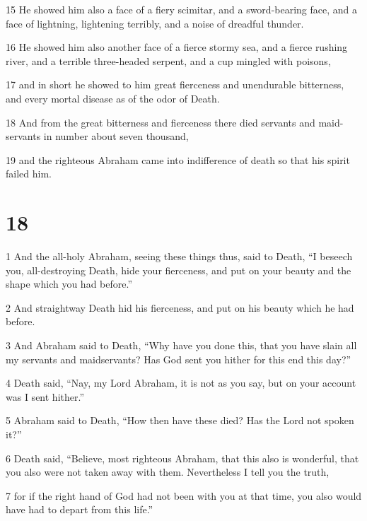 \par 15 He showed him also a face of a fiery scimitar, and a sword-bearing face, and a face of lightning, lightening terribly, and a noise of dreadful thunder. 

\par 16 He showed him also another face of a fierce stormy sea, and a fierce rushing river, and a terrible three-headed serpent, and a cup mingled with poisons, 

\par 17 and in short he showed to him great fierceness and unendurable bitterness, and every mortal disease as of the odor of Death. 

\par 18 And from the great bitterness and fierceness there died servants and maid-servants in number about seven thousand, 

\par 19 and the righteous Abraham came into indifference of death so that his spirit failed him.

\chapter{18}

\par 1 And the all-holy Abraham, seeing these things thus, said to Death, “I beseech you, all-destroying Death, hide your fierceness, and put on your beauty and the shape which you had before.” 

\par 2 And straightway Death hid his fierceness, and put on his beauty which he had before. 

\par 3 And Abraham said to Death, “Why have you done this, that you have slain all my servants and maidservants? Has God sent you hither for this end this day?” 

\par 4 Death said, “Nay, my Lord Abraham, it is not as you say, but on your account was I sent hither.” 

\par 5 Abraham said to Death, “How then have these died? Has the Lord not spoken it?” 

\par 6 Death said, “Believe, most righteous Abraham, that this also is wonderful, that you also were not taken away with them. Nevertheless I tell you the truth, 

\par 7 for if the right hand of God had not been with you at that time, you also would have had to depart from this life.” 

